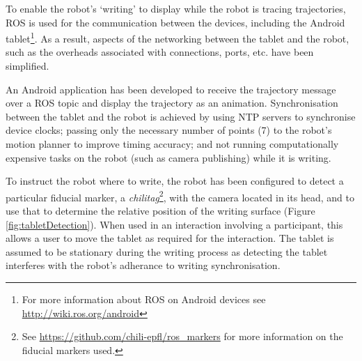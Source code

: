 \documentclass{sig-alternate}
\begin{document}

To enable the robot's `writing' to display while the robot is tracing
trajectories, ROS is used for the communication between the devices,
including the Android tablet\footnote{For more information about ROS on Android
devices see \url{http://wiki.ros.org/android}}. As a result, aspects of the
networking between the tablet and the robot, such as the overheads associated
with connections, ports, etc. have been simplified. 

An Android application has been developed to receive the trajectory message over
a ROS topic and display the trajectory as an
animation. Synchronisation between the tablet and the robot is achieved by
using NTP servers to synchronise device clocks; passing only the necessary number of points (7)
to the robot's motion planner to improve timing accuracy; and not running 
computationally expensive tasks on the robot (such as camera publishing) while it 
is writing.







To instruct the robot where to write, the robot has been configured to detect a
particular fiducial marker, a \emph{chilitag}\footnote{See
\url{https://github.com/chili-epfl/ros_markers} for more information on the
fiducial markers used.}, with the camera located in its head, and to use that to
determine the relative position of the writing surface (Figure
\ref{fig:tabletDetection}). When used in an interaction involving a participant, this
allows a user to move the tablet as required for the interaction. The tablet is 
assumed to be stationary during the writing process as detecting the tablet interferes
with the robot's adherance to writing synchronisation.
\end{document}
